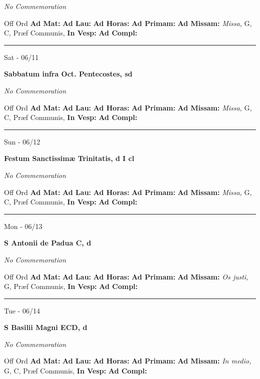 \documentclass[letterpaper, 10pt]{article}
\begin{document}
\textit{No Commemoration}\begin{justify}
Off Ord
\textbf{Ad Mat: }
\textbf{Ad Lau: }
\textbf{Ad Horas: }
\textbf{Ad Primam: }
\textbf{Ad Missam:} \textit{Missa, } G, C, Præf Communis, 
\textbf{In Vesp: }
\textbf{Ad Compl: }\end{justify}



\hrule
\begin{center}
Sat - 06/11
\end{center}\textbf{ \large Sabbatum infra Oct. Pentecostes, \textnormal{\normalsize sd}}

\textit{No Commemoration}\begin{justify}
Off Ord
\textbf{Ad Mat: }
\textbf{Ad Lau: }
\textbf{Ad Horas: }
\textbf{Ad Primam: }
\textbf{Ad Missam:} \textit{Missa, } G, C, Præf Communis, 
\textbf{In Vesp: }
\textbf{Ad Compl: }\end{justify}



\hrule
\begin{center}
Sun - 06/12
\end{center}\textbf{ \large Festum Sanctissimæ Trinitatis, \textnormal{\normalsize d I cl}}

\textit{No Commemoration}\begin{justify}
Off Ord
\textbf{Ad Mat: }
\textbf{Ad Lau: }
\textbf{Ad Horas: }
\textbf{Ad Primam: }
\textbf{Ad Missam:} \textit{Missa, } G, C, Præf Communis, 
\textbf{In Vesp: }
\textbf{Ad Compl: }\end{justify}



\hrule
\begin{center}
Mon - 06/13
\end{center}\textbf{ \large S Antonii de Padua C, \textnormal{\normalsize d}}

\textit{No Commemoration}\begin{justify}
Off Ord
\textbf{Ad Mat: }
\textbf{Ad Lau: }
\textbf{Ad Horas: }
\textbf{Ad Primam: }
\textbf{Ad Missam:} \textit{Os justi, } G, Præf Communis, 
\textbf{In Vesp: }
\textbf{Ad Compl: }\end{justify}



\hrule
\begin{center}
Tue - 06/14
\end{center}\textbf{ \large S Basilii Magni ECD, \textnormal{\normalsize d}}

\textit{No Commemoration}\begin{justify}
Off Ord
\textbf{Ad Mat: }
\textbf{Ad Lau: }
\textbf{Ad Horas: }
\textbf{Ad Primam: }
\textbf{Ad Missam:} \textit{In medio, } G, C, Præf Communis, 
\textbf{In Vesp: }
\textbf{Ad Compl: }\end{justify}
\end{document}
